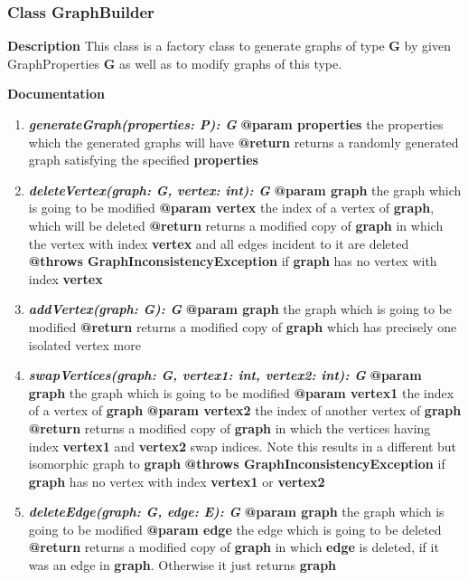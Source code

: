\documentclass{article}
\newcommand{\myclass}[1]{\subsubsection*{Class #1} \label{#1} \addcontentsline{toc}{subsubsection}{\nameref{#1}}}
\begin{document}
	\myclass{GraphBuilder}
	
	\textbf{Description}
	This class is a factory class to generate graphs of type \textbf{G} by given GraphProperties \textbf{G} as well as to modify graphs of this type.
	
	\textbf{Documentation}
	\begin{enumerate}[+]
		\item{
			\textbf{\textit{generateGraph(properties: P): G}} \newline
			\textbf{@param properties} the properties which the generated graphs will have \newline
			\textbf{@return} returns a randomly generated graph satisfying the specified \textbf{properties}
		}
		\item{
			\textbf{\textit{deleteVertex(graph: G, vertex: int): G}} \newline
			\textbf{@param graph} the graph which is going to be modified \newline
			\textbf{@param vertex} the index of a vertex of \textbf{graph}, which will be deleted \newline
			\textbf{@return} returns a modified copy of \textbf{graph} in which the vertex with index \textbf{vertex} and all edges incident to it are deleted \newline
			\textbf{@throws GraphInconsistencyException} if \textbf{graph} has no vertex with index \textbf{vertex} 
		}
		\item{
			\textbf{\textit{addVertex(graph: G): G}} \newline
			\textbf{@param graph} the graph which is going to be modified \newline
			\textbf{@return} returns a modified copy of \textbf{graph} which has precisely one isolated vertex more
		}
		\item{
			\textbf{\textit{swapVertices(graph: G, vertex1: int, vertex2: int): G}} \newline
			\textbf{@param graph} the graph which is going to be modified \newline
			\textbf{@param vertex1} the index of a vertex of \textbf{graph} \newline
			\textbf{@param vertex2} the index of another vertex of \textbf{graph} \newline
			\textbf{@return} returns a modified copy of \textbf{graph} in which the vertices having index \textbf{vertex1} and \textbf{vertex2} swap indices. Note this results in a different but isomorphic graph to \textbf{graph}  \newline
			\textbf{@throws GraphInconsistencyException} if \textbf{graph} has no vertex with index \textbf{vertex1} or \textbf{vertex2} 
		}
		\item{
			\textbf{\textit{deleteEdge(graph: G, edge: E): G}} \newline
			\textbf{@param graph} the graph which is going to be modified \newline
			\textbf{@param edge} the edge which is going to be deleted \newline
			\textbf{@return} returns a modified copy of \textbf{graph} in which \textbf{edge} is deleted, if it was an edge in \textbf{graph}. Otherwise it just returns \textbf{graph}
		}
		

\end{enumerate}
\end{document}
